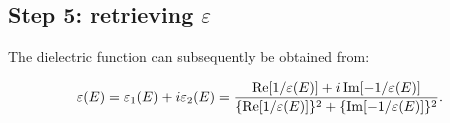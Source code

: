 \documentclass[12pt,a4paper]{article}
\def\frac#1#2{{{#1}\over {#2}}}
\numberwithin{equation}{section}
\numberwithin{figure}{section}
\numberwithin{table}{section}
\begin{document}
\subsection{Step 5: retrieving $\varepsilon$}
The dielectric function  can subsequently be obtained from:

\begin{equation}
    \varepsilon(E)=\varepsilon_{1}(E)+i \varepsilon_{2}(E)=\frac{\operatorname{Re}[1 / \varepsilon(E)]+i \operatorname{Im}[-1 / \varepsilon(E)]}{\{\operatorname{Re}[1 / \varepsilon(E)]\}^{2}+\{\operatorname{Im}[-1 / \varepsilon(E)]\}^{2}}.
\end{equation}


\vspace{2cm}


\end{document}
